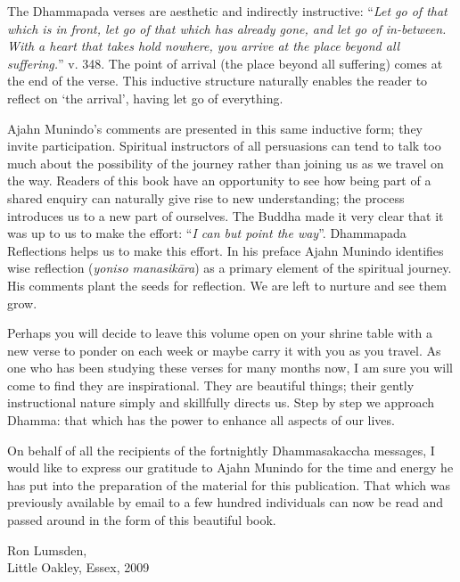 The Dhammapada verses are aesthetic and indirectly instructive: ``\emph{Let go
of that which is in front, let go of that which has already gone, and
let go of in-between. With a heart that takes hold nowhere, you arrive
at the place beyond all suffering.}'' v. 348. The point of arrival (the
place beyond all suffering) comes at the end of the verse. This
inductive structure naturally enables the reader to reflect on `the
arrival', having let go of everything.

Ajahn Munindo's comments are presented in this same inductive form; they
invite participation. Spiritual instructors of all persuasions can tend
to talk too much about the possibility of the journey rather than
joining us as we travel on the way. Readers of this book have an
opportunity to see how being part of a shared enquiry can naturally give
rise to new understanding; the process introduces us to a new part of
ourselves. The Buddha made it very clear that it was up to us to make
the effort: ``\emph{I can but point the way}''. Dhammapada Reflections helps us
to make this effort. In his preface Ajahn Munindo identifies wise
reflection (\emph{yoniso manasikāra}) as a primary element of the spiritual
journey. His comments plant the seeds for reflection. We are left to
nurture and see them grow.

Perhaps you will decide to leave this volume open on your shrine table
with a new verse to ponder on each week or maybe carry it with you as
you travel. As one who has been studying these verses for many months
now, I am sure you will come to find they are inspirational. They are
beautiful things; their gently instructional nature simply and
skillfully directs us. Step by step we approach Dhamma: that which has
the power to enhance all aspects of our lives.

On behalf of all the recipients of the fortnightly Dhammasakaccha
messages, I would like to express our gratitude to Ajahn Munindo for the
time and energy he has put into the preparation of the material for this
publication. That which was previously available by email to a few
hundred individuals can now be read and passed around in the form of
this beautiful book.

\bigskip

{\par\raggedleft
Ron Lumsden,\\
Little Oakley, Essex, 2009
\par}

